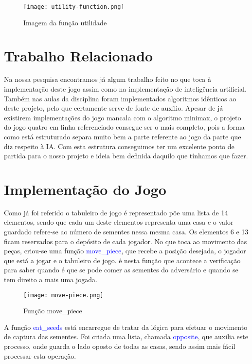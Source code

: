\documentclass[conference]{IEEEtran}
\begin{document}
\begin{figure}[htbp]
    \centerline{\texttt{[image: utility-function.png]}}
    \caption{Imagem da fun\c c\~ao utilidade}
    \label{img6}
\end{figure}

\section{Trabalho Relacionado}

Na nossa pesquisa encontramos j\'a algum trabalho feito no que toca \`a implementa\c c\~ao deste jogo assim como na implementa\c c\~ao de intelig\^encia artificial\cite{b2}\cite{b3}\cite{b9}.
Tamb\'em nas aulas da disciplina foram implementados algoritmos id\^enticos ao deste projeto, pelo que certamente serve de fonte de aux\'ilio.
Apesar de j\'a existirem implementa\c c\~oes do jogo mancala com o algoritmo minimax, o projeto do jogo quatro em linha referenciado consegue ser o mais completo, pois a forma como est\'a estruturado separa muito bem a parte referente ao jogo da parte que diz respeito \`a IA.
Com esta estrutura conseguimos ter um excelente ponto de partida para o nosso projeto e ideia bem definida daquilo que t\'inhamos que fazer.

\section{Implementa\c c\~ao do Jogo}
Como j\'a foi referido o tabuleiro de jogo \'e representado p\~oe uma lista de 14 elementos, sendo que cada um deste elementos representa uma casa e o valor guardado refere-se ao n\'umero de sementes nessa mesma casa.
Os elementos 6 e 13 ficam reservados para o dep\'osito de cada jogador.
No que toca ao movimento das pe\c cas, criou-se uma fun\c c\~ao \textcolor{blue}{move\_piece}, que recebe a posi\c c\~ao desejada, o jogador que est\'a a jogar e o tabuleiro de jogo. \'e nesta fun\c c\~ao que acontece a verifica\c c\~ao para saber quando \'e que se pode comer as sementes do advers\'ario e quando se tem direito a mais uma jogada.

\begin{figure}[htbp]
    \centerline{\texttt{[image: move-piece.png]}}
    \caption{Fun\c c\~ao move\_piece}
    \label{img7}
\end{figure}

A fun\c c\~ao \textcolor{blue}{eat\_seeds} est\'a encarregue de tratar da l\'ogica para efetuar o movimento de captura das sementes. Foi criada uma lista, chamada \textcolor{blue}{opposite}, que auxilia este processo, onde guarda o lado oposto de todas as casas, sendo assim mais f\'acil processar esta opera\c c\~ao.
\end{document}

